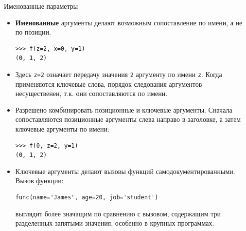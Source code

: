 \documentclass[aspectratio=169, mathserif]{beamer}%
\begin{document}
\begin{frame}[fragile]{Именованные параметры}
\scriptsize
\begin{itemize}
\item \textcolor{extraorange}{\textbf{Именованные}} аргументы делают возможным сопоставление по имени, а не по позиции.

\begin{verbatim}
>>> f(z=2, x=0, y=1)
(0, 1, 2)
\end{verbatim}

\item Здесь \texttt{z=2} означает передачу значения \texttt{2} аргументу по имени \texttt{z}. Когда применяются ключевые слова, порядок следования аргументов несущественен, т.к. они сопоставляются по имени. 
\item Разрешено комбинировать позиционные и ключевые аргументы. Сначала сопоставляются позиционные аргументы слева направо в заголовке, а затем ключевые аргументы по имени:

\begin{verbatim}
>>> f(0, z=2, y=1)
(0, 1, 2)
\end{verbatim}

\item Ключевые аргументы делают вызовы функций самодокументированными. Вызов функции:

\begin{verbatim}
func(name='James', age=20, job='student')
\end{verbatim}

\noindent выглядит более значащим по сравнению с вызовом, содержащим три разделенных запятыми значения, особенно в крупных программах.
\end{itemize}
\vfill
\end{frame}
\end{document}
